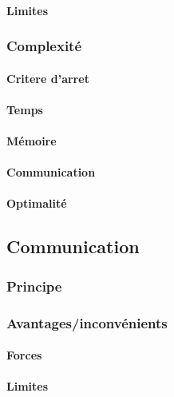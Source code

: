 \documentclass[a4paper, 10pt]{article}
\begin{document}
\paragraph{Limites}

\subsubsection{Complexité}

\paragraph{Critere d'arret}

\paragraph{Temps}

\paragraph{Mémoire}

\paragraph{Communication}

\paragraph{Optimalité}

\subsection{Communication}

\subsubsection{Principe}

\subsubsection{Avantages/inconvénients}

\paragraph{Forces}

\paragraph{Limites}
\end{document}

